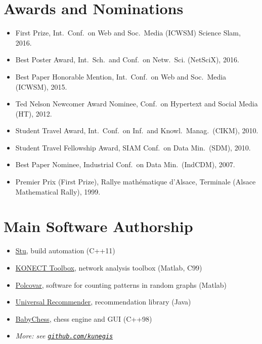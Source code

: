 \documentclass[line,margin]{res}
\newcounter{x}
\begin{document}
\begin{resume}
\section{Awards and Nominations}
\begin{itemize}
  \item First Prize, Int.\ Conf.\ on Web and Soc.\ Media (ICWSM) Science Slam, 2016.
  \item Best Poster Award, Int.\ Sch.\ and Conf.\ on Netw.\ Sci.
    (NetSciX), 2016. 
  \item Best Paper Honorable Mention, Int.\ Conf.\ on Web and Soc.\ Media (ICWSM), 2015.  
  \item Ted Nelson Newcomer Award Nominee, Conf.\ on Hypertext and
    Social Media (HT), 2012.   
  \item Student Travel Award, Int.\ Conf.\ on Inf.\ and Knowl.\ Manag.\ (CIKM), 2010. 
  \item Student Travel Fellowship Award, SIAM Conf.\ on Data Min.\ (SDM),
    2010.  
  \item Best Paper Nominee, Industrial Conf.\ on Data Min.\ (IndCDM), 2007.    
  \item Premier Prix (First Prize), Rallye mathématique d'Alsace, Terminale (Alsace Mathematical Rally), 1999. 
\end{itemize}

\section{Main Software Authorship}
\begin{itemize}
  \item \href{https://github.com/kunegis/stu}{Stu}, build automation (C++11)
  \item \href{https://github.com/kunegis/konect-toolbox}{KONECT Toolbox}, network analysis toolbox (Matlab, C99)
  \item \href{https://west.uni-koblenz.de/Research/systems/polcovar}{Polcovar}, software for counting patterns in random graphs (Matlab)
  \item \href{https://github.com/kunegis/universal-recommender}{Universal Recommender}, recommendation library (Java)
  \item \href{https://github.com/kunegis/babychess}{BabyChess}, chess engine and GUI (C++98)
  \item \emph{More:  see {\tt \href{https://github.com/kunegis}{github.com/kunegis}}}
\end{itemize}


\end{resume}
\end{document}
